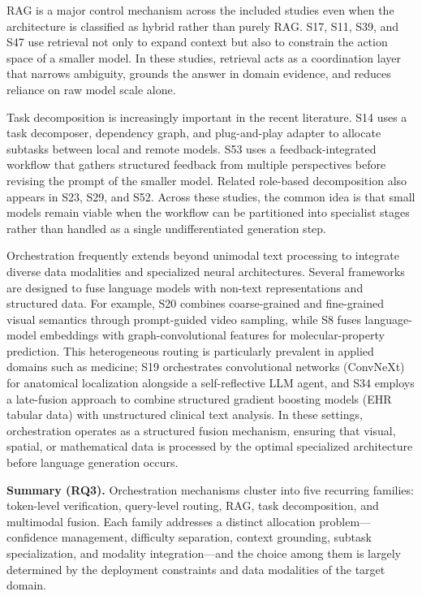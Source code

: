 RAG is a major control mechanism across the included studies even when the architecture is classified as hybrid rather than purely RAG. S17, S11, S39, and S47 use retrieval not only to expand context but also to constrain the action space of a smaller model. In these studies, retrieval acts as a coordination layer that narrows ambiguity, grounds the answer in domain evidence, and reduces reliance on raw model scale alone.

Task decomposition is increasingly important in the recent literature. S14 uses a task decomposer, dependency graph, and plug-and-play adapter to allocate subtasks between local and remote models. S53 uses a feedback-integrated workflow that gathers structured feedback from multiple perspectives before revising the prompt of the smaller model. Related role-based decomposition also appears in S23, S29, and S52. Across these studies, the common idea is that small models remain viable when the workflow can be partitioned into specialist stages rather than handled as a single undifferentiated generation step.

Orchestration frequently extends beyond unimodal text processing to integrate diverse data modalities and specialized neural architectures. Several frameworks are designed to fuse language models with non-text representations and structured data. For example, S20 combines coarse-grained and fine-grained visual semantics through prompt-guided video sampling, while S8 fuses language-model embeddings with graph-convolutional features for molecular-property prediction. This heterogeneous routing is particularly prevalent in applied domains such as medicine; S19 orchestrates convolutional networks (ConvNeXt) for anatomical localization alongside a self-reflective LLM agent, and S34 employs a late-fusion approach to combine structured gradient boosting models (EHR tabular data) with unstructured clinical text analysis. In these settings, orchestration operates as a structured fusion mechanism, ensuring that visual, spatial, or mathematical data is processed by the optimal specialized architecture before language generation occurs.

\noindent\textbf{Summary (RQ3).} Orchestration mechanisms cluster into five recurring families: token-level verification, query-level routing, RAG, task decomposition, and multimodal fusion. Each family addresses a distinct allocation problem---confidence management, difficulty separation, context grounding, subtask specialization, and modality integration---and the choice among them is largely determined by the deployment constraints and data modalities of the target domain.

